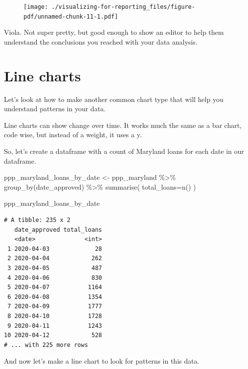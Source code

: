 \documentclass[
  letterpaper,
  DIV=11,
  numbers=noendperiod]{scrreprt}
\newenvironment{Shaded}{\begin{snugshade}}{\end{snugshade}}
\newcommand{\AttributeTok}[1]{\textcolor[rgb]{0.40,0.45,0.13}{#1}}
\newcommand{\FunctionTok}[1]{\textcolor[rgb]{0.28,0.35,0.67}{#1}}
\newcommand{\NormalTok}[1]{\textcolor[rgb]{0.00,0.23,0.31}{#1}}
\newcommand{\OtherTok}[1]{\textcolor[rgb]{0.00,0.23,0.31}{#1}}
\newcommand{\SpecialCharTok}[1]{\textcolor[rgb]{0.37,0.37,0.37}{#1}}
\begin{document}
\begin{figure}[H]

{\centering \texttt{[image: ./visualizing-for-reporting\_files/figure-pdf/unnamed-chunk-11-1.pdf]}

}

\end{figure}

Viola. Not super pretty, but good enough to show an editor to help them
understand the conclusions you reached with your data analysis.

\hypertarget{line-charts}{%
\section{Line charts}\label{line-charts}}

Let's look at how to make another common chart type that will help you
understand patterns in your data.

Line charts can show change over time. It works much the same as a bar
chart, code wise, but instead of a weight, it uses a y.

So, let's create a dataframe with a count of Maryland loans for each
date in our dataframe.

\begin{Shaded}
\begin{Highlighting}[]
\NormalTok{ppp\_maryland\_loans\_by\_date }\OtherTok{\textless{}{-}}\NormalTok{ ppp\_maryland }\SpecialCharTok{\%\textgreater{}\%}
  \FunctionTok{group\_by}\NormalTok{(date\_approved) }\SpecialCharTok{\%\textgreater{}\%}
  \FunctionTok{summarise}\NormalTok{(}
    \AttributeTok{total\_loans=}\FunctionTok{n}\NormalTok{()}
\NormalTok{  )}

\NormalTok{ppp\_maryland\_loans\_by\_date}
\end{Highlighting}
\end{Shaded}

\begin{verbatim}
# A tibble: 235 x 2
   date_approved total_loans
   <date>              <int>
 1 2020-04-03             28
 2 2020-04-04            262
 3 2020-04-05            487
 4 2020-04-06            830
 5 2020-04-07           1164
 6 2020-04-08           1354
 7 2020-04-09           1777
 8 2020-04-10           1728
 9 2020-04-11           1243
10 2020-04-12            528
# ... with 225 more rows
\end{verbatim}

And now let's make a line chart to look for patterns in this data.
\end{document}
